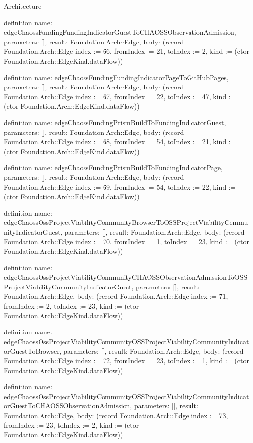 \begin{lexlean}{Architecture}
\begin{semanticmodule}
definition{
  name: edgeChaossFundingFundingIndicatorGuestToCHAOSSObservationAdmission,
  parameters: [],
  result: Foundation.Arch::Edge,
  body: (record Foundation.Arch::Edge {index := 66, fromIndex := 21, toIndex := 2, kind := (ctor Foundation.Arch::EdgeKind.dataFlow)})
}

definition{
  name: edgeChaossFundingFundingIndicatorPageToGitHubPages,
  parameters: [],
  result: Foundation.Arch::Edge,
  body: (record Foundation.Arch::Edge {index := 67, fromIndex := 22, toIndex := 47, kind := (ctor Foundation.Arch::EdgeKind.dataFlow)})
}

definition{
  name: edgeChaossFundingPrismBuildToFundingIndicatorGuest,
  parameters: [],
  result: Foundation.Arch::Edge,
  body: (record Foundation.Arch::Edge {index := 68, fromIndex := 54, toIndex := 21, kind := (ctor Foundation.Arch::EdgeKind.dataFlow)})
}

definition{
  name: edgeChaossFundingPrismBuildToFundingIndicatorPage,
  parameters: [],
  result: Foundation.Arch::Edge,
  body: (record Foundation.Arch::Edge {index := 69, fromIndex := 54, toIndex := 22, kind := (ctor Foundation.Arch::EdgeKind.dataFlow)})
}

definition{
  name: edgeChaossOssProjectViabilityCommunityBrowserToOSSProjectViabilityCommunityIndicatorGuest,
  parameters: [],
  result: Foundation.Arch::Edge,
  body: (record Foundation.Arch::Edge {index := 70, fromIndex := 1, toIndex := 23, kind := (ctor Foundation.Arch::EdgeKind.dataFlow)})
}

definition{
  name: edgeChaossOssProjectViabilityCommunityCHAOSSObservationAdmissionToOSSProjectViabilityCommunityIndicatorGuest,
  parameters: [],
  result: Foundation.Arch::Edge,
  body: (record Foundation.Arch::Edge {index := 71, fromIndex := 2, toIndex := 23, kind := (ctor Foundation.Arch::EdgeKind.dataFlow)})
}

definition{
  name: edgeChaossOssProjectViabilityCommunityOSSProjectViabilityCommunityIndicatorGuestToBrowser,
  parameters: [],
  result: Foundation.Arch::Edge,
  body: (record Foundation.Arch::Edge {index := 72, fromIndex := 23, toIndex := 1, kind := (ctor Foundation.Arch::EdgeKind.dataFlow)})
}

definition{
  name: edgeChaossOssProjectViabilityCommunityOSSProjectViabilityCommunityIndicatorGuestToCHAOSSObservationAdmission,
  parameters: [],
  result: Foundation.Arch::Edge,
  body: (record Foundation.Arch::Edge {index := 73, fromIndex := 23, toIndex := 2, kind := (ctor Foundation.Arch::EdgeKind.dataFlow)})
}


\end{semanticmodule}
\end{lexlean}
